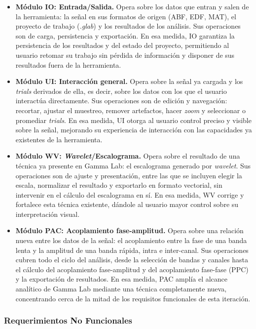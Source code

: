 \documentclass[12pt,letterpaper,oneside]{article}
\begin{document}
\begin{itemize}
    \item \textbf{Módulo IO: Entrada/Salida.} Opera sobre los datos que entran y salen de la herramienta: la señal en sus formatos de origen (ABF, EDF, MAT), el proyecto de trabajo (\textit{.glab}) y los resultados de los análisis. Sus operaciones son de carga, persistencia y exportación. En esa medida, IO garantiza la persistencia de los resultados y del estado del proyecto, permitiendo al usuario retomar su trabajo sin pérdida de información y disponer de sus resultados fuera de la herramienta.

    \item \textbf{Módulo UI: Interacción general.} Opera sobre la señal ya cargada y los \textit{trials} derivados de ella, es decir, sobre los datos con los que el usuario interactúa directamente. Sus operaciones son de edición y navegación: recortar, ajustar el muestreo, remover artefactos, hacer \textit{zoom} y seleccionar o promediar \textit{trials}. En esa medida, UI otorga al usuario control preciso y visible sobre la señal, mejorando su experiencia de interacción con las capacidades ya existentes de la herramienta.

    \item \textbf{Módulo WV: \textit{Wavelet}/Escalograma.} Opera sobre el resultado de una técnica ya presente en Gamma Lab: el escalograma generado por \textit{wavelet}. Sus operaciones son de ajuste y presentación, entre las que se incluyen elegir la escala, normalizar el resultado y exportarlo en formato vectorial, sin intervenir en el cálculo del escalograma en sí. En esa medida, WV corrige y fortalece esta técnica existente, dándole al usuario mayor control sobre su interpretación visual.

    \item \textbf{Módulo PAC: Acoplamiento fase-amplitud.} Opera sobre una relación nueva entre los datos de la señal: el acoplamiento entre la fase de una banda lenta y la amplitud de una banda rápida, intra e inter-canal. Sus operaciones cubren todo el ciclo del análisis, desde la selección de bandas y canales hasta el cálculo del acoplamiento fase-amplitud y del acoplamiento fase-fase (PPC) y la exportación de resultados. En esa medida, PAC amplía el alcance analítico de Gamma Lab mediante una técnica completamente nueva, concentrando cerca de la mitad de los requisitos funcionales de esta iteración.
\end{itemize}

\subsubsection{Requerimientos No Funcionales}
\end{document}
